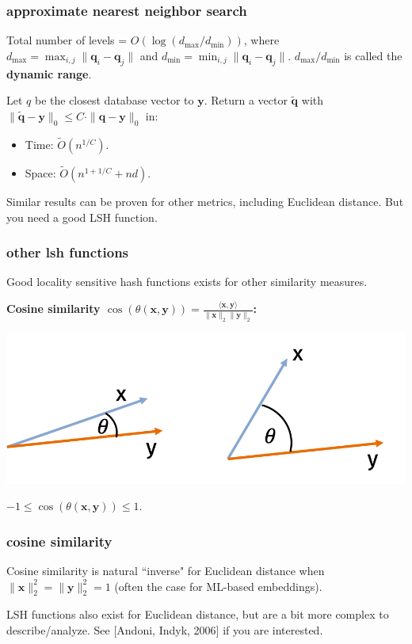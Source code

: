 \documentclass[compress]{beamer}
\newcommand{\bv}[1]{\mathbf{#1}}
\begin{document}
\begin{frame}
	\frametitle{approximate nearest neighbor search}
	Total number of levels = $O(\log(d_{\max}/d_{\min}))$, where $d_{\max} = \max_{i,j}\|\bv{q}_i - \bv{q}_j\|$ and $d_{\min} = \min_{i,j}\|\bv{q}_i - \bv{q}_j\|$. $d_{\max}/d_{\min}$ is called the \textbf{dynamic range}.

		\begin{theorem}
		Let $q$ be the closest database vector to $\bv{y}$. Return a vector $\tilde{\bv{q}}$ with $\|\tilde{\bv{q}} - \bv{y}\|_0 \leq C\cdot \|{\bv{q}} - \bv{y}\|_0$ in:
		\begin{itemize}
			\item Time: $\tilde{O}\left(n^{1/C}\right)$.
			\item Space: $\tilde{O}\left(n^{1 + 1/C} + nd\right)$. 
		\end{itemize}
	\end{theorem}
	Similar results can be proven for other metrics, including Euclidean distance. But you need a good LSH function.
\end{frame}

\begin{frame}
	\frametitle{other lsh functions}
	\begin{center}
	Good locality sensitive hash functions exists for other similarity measures.
	\end{center}
	\textbf{Cosine similarity $\cos\left(\theta(\bv{x},\bv{y})\right) = \frac{\langle \bv{x},\bv{y}\rangle}{\|\bv{x}\|_2\|\bv{y}\|_2}$:}
	\begin{center}
		\includegraphics[width=.7\textwidth]{cos_sim.png}
		
		$-1 \leq \cos\left(\theta(\bv{x},\bv{y})\right) \leq 1$.
	\end{center}
\end{frame}

\begin{frame}
	\frametitle{cosine similarity}
		Cosine similarity is natural ``inverse" for Euclidean distance when $\|\bv{x}\|_2^2 = \|\bv{y}\|_2^2 = 1$ (often the case for ML-based embeddings).


	\vspace{5em}
	LSH functions also exist for Euclidean distance, but are a bit more complex to describe/analyze. See [Andoni, Indyk, 2006] if you are interested.
\end{frame}
\end{document}
